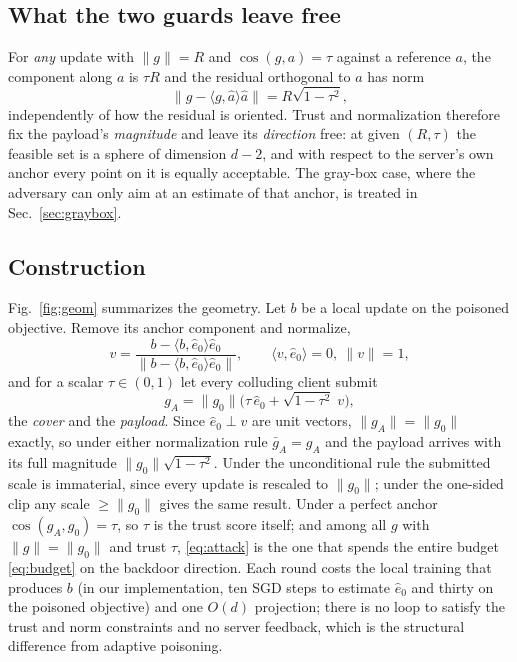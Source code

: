 \documentclass{article}
\begin{document}
\subsection{What the two guards leave free}
For \emph{any} update with $\|g\|=R$ and $\cos(g,a)=\tau$ against a reference $a$,
the component along $a$ is $\tau R$ and the residual orthogonal to $a$ has norm
\begin{equation}
  \bigl\|g-\langle g,\hat a\rangle\hat a\bigr\| = R\sqrt{1-\tau^{2}},
  \label{eq:budget}
\end{equation}
independently of how the residual is oriented. Trust and normalization therefore
fix the payload's \emph{magnitude} and leave its \emph{direction} free: at given
$(R,\tau)$ the feasible set is a sphere of dimension $d-2$, and with respect to
the server's own anchor every point on it is equally acceptable. The gray-box
case, where the adversary can only aim at an estimate of that anchor, is treated
in Sec.~\ref{sec:graybox}.

\subsection{Construction}
Fig.~\ref{fig:geom} summarizes the geometry. Let $b$ be a local update on the
poisoned objective. Remove its anchor component and normalize,
\begin{equation}
  v=\frac{b-\langle b,\hat e_0\rangle\hat e_0}{\|b-\langle b,\hat e_0\rangle\hat e_0\|},
  \qquad \langle v,\hat e_0\rangle=0,\ \|v\|=1,
  \label{eq:payload}
\end{equation}
and for a scalar $\tau\in(0,1)$ let every colluding client submit
\begin{equation}
  g_A=\|g_0\|\bigl(\tau\,\hat e_0+\sqrt{1-\tau^{2}}\;v\bigr),
  \label{eq:attack}
\end{equation}
the \emph{cover} and the \emph{payload}. Since $\hat e_0\perp v$ are unit vectors,
$\|g_A\|=\|g_0\|$ exactly, so under either normalization rule $\bar g_A=g_A$ and
the payload arrives with its full magnitude $\|g_0\|\sqrt{1-\tau^{2}}$. Under the
unconditional rule the submitted scale is immaterial, since every update is
rescaled to $\|g_0\|$; under the one-sided clip any scale $\ge\|g_0\|$ gives the
same result. Under a perfect anchor $\cos(g_A,g_0)=\tau$, so $\tau$ is the trust
score itself; and among all $g$ with $\|g\|=\|g_0\|$ and trust $\tau$,
\eqref{eq:attack} is the one that spends the entire budget \eqref{eq:budget} on
the backdoor direction. Each round costs the local training that produces $b$ (in our implementation, ten SGD steps to estimate $\hat e_0$ and thirty on the poisoned objective) and one $O(d)$ projection; there is no loop to satisfy the trust and norm constraints and no server feedback, which is the structural difference from adaptive poisoning.
\end{document}
